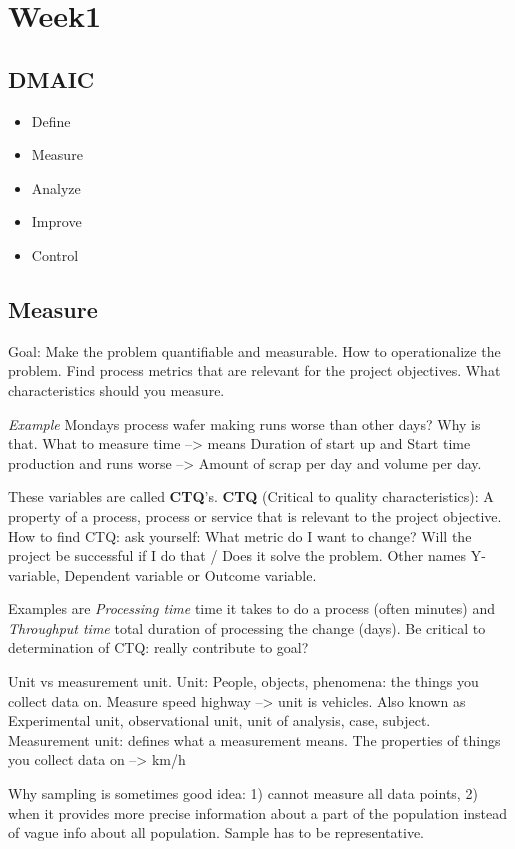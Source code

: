 \documentclass{notes}
\begin{document}
\section{Week1}
\subsection{DMAIC}
\begin{itemize}
    \item Define
    \item Measure
    \item Analyze
    \item Improve
    \item Control
\end{itemize}
\subsection{Measure}
Goal: Make the problem quantifiable and measurable. How to operationalize the problem. 
Find process metrics that are relevant for the project objectives. What characteristics should you measure.

\emph{Example}
Mondays process wafer making runs worse than other days? Why is that. What to measure time --> means Duration of start up and Start time production and runs worse --> Amount of scrap per day and volume per day.

These variables are called \textbf{CTQ}'s. 
\textbf{CTQ} (Critical to quality characteristics): A property of a process, process or service that is relevant to the project objective.
How to find CTQ:
ask yourself: What metric do I want to change? Will the project be successful if I do that / Does it solve the problem. Other names Y-variable, Dependent variable or Outcome variable.

Examples are \textit{Processing time} time it takes to do a process (often minutes) and \textit{Throughput time} total duration of processing the change (days). Be critical to determination of CTQ: really contribute to goal?

Unit vs measurement unit.
Unit: People, objects, phenomena: the things you collect data on. Measure speed highway --> unit is vehicles. Also known as Experimental unit, observational unit, unit of analysis, case, subject.
Measurement unit: defines what a measurement means. The properties of things you collect data on --> km/h

Why sampling is sometimes good idea: 1) cannot measure all data points, 2) when it provides more precise information about a part of the population instead of vague info about all population. 
Sample has to be representative. 
\end{document}
